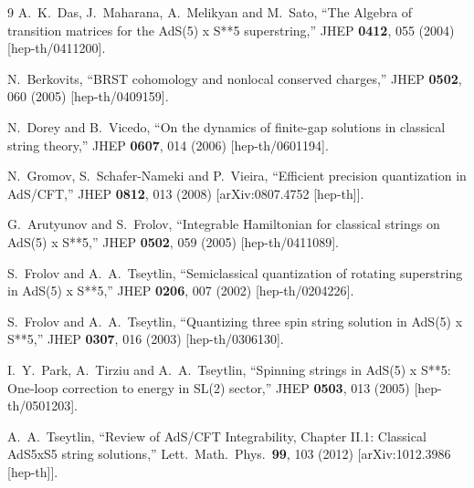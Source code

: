 \documentclass[a4paper,11pt]{article}
\numberwithin{equation}{section}
\begin{document}
\begin{thebibliography} {9}
  A.~K.~Das, J.~Maharana, A.~Melikyan and M.~Sato,
  ``The Algebra of transition matrices for the AdS(5) x S**5 superstring,''
  JHEP {\bf 0412}, 055 (2004)
  [hep-th/0411200].

  N.~Berkovits,
  ``BRST cohomology and nonlocal conserved charges,''
  JHEP {\bf 0502}, 060 (2005)
  [hep-th/0409159].

  N.~Dorey and B.~Vicedo,
  ``On the dynamics of finite-gap solutions in classical string theory,''
  JHEP {\bf 0607}, 014 (2006)
  [hep-th/0601194].

  N.~Gromov, S.~Schafer-Nameki and P.~Vieira,
  ``Efficient precision quantization in AdS/CFT,''
  JHEP {\bf 0812}, 013 (2008)
  [arXiv:0807.4752 [hep-th]].

  G.~Arutyunov and S.~Frolov,
  ``Integrable Hamiltonian for classical strings on AdS(5) x S**5,''
  JHEP {\bf 0502}, 059 (2005)
  [hep-th/0411089].

  S.~Frolov and A.~A.~Tseytlin,
  ``Semiclassical quantization of rotating superstring in AdS(5) x S**5,''
  JHEP {\bf 0206}, 007 (2002)
  [hep-th/0204226].

  S.~Frolov and A.~A.~Tseytlin,
  ``Quantizing three spin string solution in AdS(5) x S**5,''
  JHEP {\bf 0307}, 016 (2003)
  [hep-th/0306130].

  I.~Y.~Park, A.~Tirziu and A.~A.~Tseytlin,
  ``Spinning strings in AdS(5) x S**5: One-loop correction to energy in SL(2) sector,''
  JHEP {\bf 0503}, 013 (2005)
  [hep-th/0501203].

  A.~A.~Tseytlin,
  ``Review of AdS/CFT Integrability, Chapter II.1: Classical AdS5xS5 string solutions,''
  Lett.\ Math.\ Phys.\  {\bf 99}, 103 (2012)
  [arXiv:1012.3986 [hep-th]].


\end{thebibliography}
\end{document}
